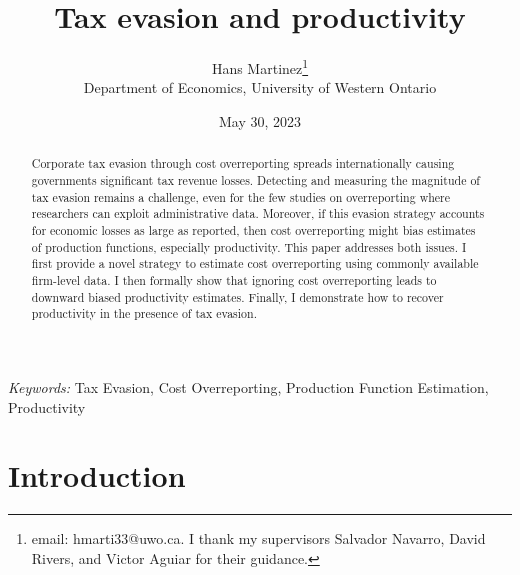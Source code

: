 \documentclass[
  12pt]{article}
\theoremstyle{definition}
\theoremstyle{remark}
\begin{document}
\def\spacingset#1{\renewcommand{\baselinestretch}%
{#1}\small\normalsize} \spacingset{1}



\date{May 30, 2023}
\title{\bf Tax evasion and productivity}
\author{
Hans Martinez\thanks{email: hmarti33@uwo.ca. I thank my supervisors
Salvador Navarro, David Rivers, and Victor Aguiar for their guidance.}\\
Department of Economics, University of Western Ontario\\
}
\maketitle

\bigskip
\bigskip
\begin{abstract}
Corporate tax evasion through cost overreporting spreads internationally
causing governments significant tax revenue losses. Detecting and
measuring the magnitude of tax evasion remains a challenge, even for the
few studies on overreporting where researchers can exploit
administrative data. Moreover, if this evasion strategy accounts for
economic losses as large as reported, then cost overreporting might bias
estimates of production functions, especially productivity. This paper
addresses both issues. I first provide a novel strategy to estimate cost
overreporting using commonly available firm-level data. I then formally
show that ignoring cost overreporting leads to downward biased
productivity estimates. Finally, I demonstrate how to recover
productivity in the presence of tax evasion.
\end{abstract}

\noindent%
{\it Keywords:} Tax Evasion, Cost Overreporting, Production Function
Estimation, Productivity
\vfill

\newpage
\spacingset{1.9} %
\ifdefined\Shaded\renewenvironment{Shaded}{\begin{tcolorbox}[boxrule=0pt, breakable, enhanced, frame hidden, borderline west={3pt}{0pt}{shadecolor}, sharp corners, interior hidden]}{\end{tcolorbox}}\fi

\hypertarget{introduction}{%
\section*{Introduction}\label{introduction}}
\end{document}
